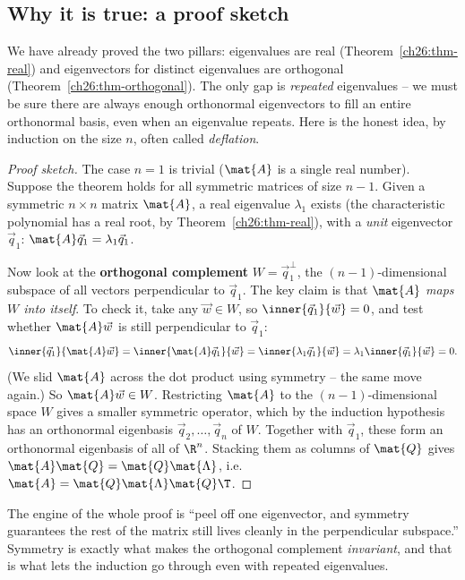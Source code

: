 \subsection{Why it is true: a proof sketch}
\label{ch26:proof-sketch}

We have already proved the two pillars: eigenvalues are real
(Theorem~\ref{ch26:thm-real}) and eigenvectors for distinct eigenvalues are
orthogonal (Theorem~\ref{ch26:thm-orthogonal}). The only gap is \emph{repeated}
eigenvalues -- we must be sure there are always enough orthonormal eigenvectors to
fill an entire orthonormal basis, even when an eigenvalue repeats. Here is the
honest idea, by induction on the size $n$, often called \emph{deflation}.

\begin{proof}[Proof sketch]
The case $n=1$ is trivial ($\mat{A}$ is a single real number). Suppose the theorem
holds for all symmetric matrices of size $n-1$. Given a symmetric $n\times n$
matrix $\mat{A}$, a real eigenvalue $\lambda_1$ exists (the characteristic
polynomial has a real root, by Theorem~\ref{ch26:thm-real}), with a \emph{unit}
eigenvector $\vec{q}_1$: $\mat{A}\vec{q}_1=\lambda_1\vec{q}_1$.

Now look at the \textbf{orthogonal complement} $W = \vec{q}_1^{\perp}$, the
$(n-1)$-dimensional subspace of all vectors perpendicular to $\vec{q}_1$. The key
claim is that $\mat{A}$ \emph{maps $W$ into itself}. To check it, take any
$\vec{w}\in W$, so $\inner{\vec{q}_1}{\vec{w}}=0$, and test whether $\mat{A}\vec{w}$
is still perpendicular to $\vec{q}_1$:
\[
  \inner{\vec{q}_1}{\mat{A}\vec{w}}
  = \inner{\mat{A}\vec{q}_1}{\vec{w}}
  = \inner{\lambda_1\vec{q}_1}{\vec{w}}
  = \lambda_1\inner{\vec{q}_1}{\vec{w}} = 0.
\]
(We slid $\mat{A}$ across the dot product using symmetry -- the same move again.)
So $\mat{A}\vec{w}\in W$. Restricting $\mat{A}$ to the $(n-1)$-dimensional space
$W$ gives a smaller symmetric operator, which by the induction hypothesis has an
orthonormal eigenbasis $\vec{q}_2,\dots,\vec{q}_n$ of $W$. Together with
$\vec{q}_1$, these form an orthonormal eigenbasis of all of $\R^n$. Stacking them
as columns of $\mat{Q}$ gives $\mat{A}\mat{Q}=\mat{Q}\mat{\Lambda}$, i.e.
$\mat{A}=\mat{Q}\mat{\Lambda}\mat{Q}\T$.
\end{proof}

The engine of the whole proof is ``peel off one eigenvector, and symmetry
guarantees the rest of the matrix still lives cleanly in the perpendicular
subspace.'' Symmetry is exactly what makes the orthogonal complement
\emph{invariant}, and that is what lets the induction go through even with repeated
eigenvalues.

